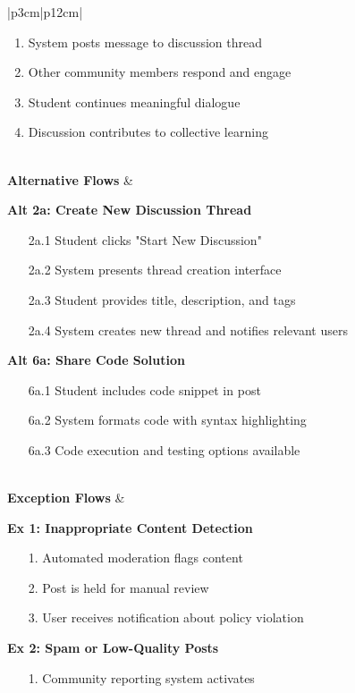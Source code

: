 \documentclass[12pt,a4paper]{article}
\begin{document}
\begin{longtable}{|p{3cm}|p{12cm}|}
\begin{minipage}[t]{\linewidth}
\begin{enumerate}[leftmargin=*,noitemsep,topsep=0pt]
    \item System posts message to discussion thread
    \item Other community members respond and engage
    \item Student continues meaningful dialogue
    \item Discussion contributes to collective learning
\end{enumerate}
\end{minipage} \\
\hline
\textbf{Alternative Flows} & 
\begin{minipage}[t]{\linewidth}
\textbf{Alt 2a: Create New Discussion Thread}
\begin{enumerate}[leftmargin=*,noitemsep,topsep=0pt]
    \item[2a.1] Student clicks "Start New Discussion"
    \item[2a.2] System presents thread creation interface
    \item[2a.3] Student provides title, description, and tags
    \item[2a.4] System creates new thread and notifies relevant users
\end{enumerate}
\textbf{Alt 6a: Share Code Solution}
\begin{enumerate}[leftmargin=*,noitemsep,topsep=0pt]
    \item[6a.1] Student includes code snippet in post
    \item[6a.2] System formats code with syntax highlighting
    \item[6a.3] Code execution and testing options available
\end{enumerate}
\end{minipage} \\
\hline
\textbf{Exception Flows} & 
\begin{minipage}[t]{\linewidth}
\textbf{Ex 1: Inappropriate Content Detection}
\begin{enumerate}[leftmargin=*,noitemsep,topsep=0pt]
    \item[1.] Automated moderation flags content
    \item[2.] Post is held for manual review
    \item[3.] User receives notification about policy violation
\end{enumerate}
\textbf{Ex 2: Spam or Low-Quality Posts}
\begin{enumerate}[leftmargin=*,noitemsep,topsep=0pt]
    \item[1.] Community reporting system activates

\end{enumerate}
\end{minipage}
\end{longtable}
\end{document}
